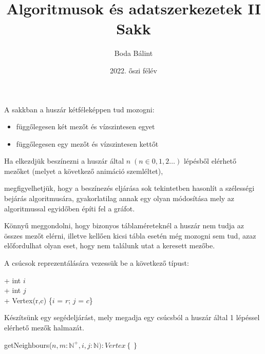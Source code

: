 \documentclass[a4paper,12pt]{article}
\title{\huge{Algoritmusok és adatszerkezetek II} \\ \large Sakk}
\author{Boda Bálint}
\date{2022. őszi félév}
\begin{document}
    \maketitle
    \noindent
    A sakkban a huszár kétféleképpen tud mozogni: \begin{itemize}
    	\item függőlegesen két mezőt és vízszintesen egyet
    	\item függőlegesen egy mezőt és vízszintesen kettőt
    \end{itemize}
	Ha elkezdjük beszínezni a huszár által $n \; \left( n \in 0,1,2\dots\right)$ lépésből elérhető mezőket (melyet a következő animáció szemléltet),  
	
	\begin{center}
	\end{center}

	\noindent
	megfigyelhetjük, hogy a beszínezés eljárása sok tekintetben hasonlít a szélességi bejárás algoritmusára, gyakorlatilag annak egy olyan módosítása mely az algoritmussal egyidőben építi fel a gráfot.

	Könnyű meggondolni, hogy bizonyos táblaméreteknél a huszár nem tudja az összes mezőt elérni, illetve kellően kicsi tábla esetén még mozogni sem tud, azaz előfordulhat olyan eset, hogy nem találunk utat a keresett mezőbe.
	
	
	\newpage
	\noindent
	A csúcsok reprezentálására vezessük be a következő típust:
	\begin{center}
		+ int $i$ \\
		+ int $j$ \\
		\hline
		+ Vertex(r,c) \{$i$ = $r$; $j$ = $c$\} \\
		\eoStruct
	\end{center}

	
	Készítsünk egy segédeljárást, mely megadja egy csúcsból a huszár által 1 lépéssel elérhető mezők halmazát.
	\begin{stuki*}[10cm]{getNeighbours($n,m:\mathbb{N}^{+},i,j:\mathbb{N}): Vertex \left\lbrace \right\rbrace $}
		\begin{WHILE}{2}{}
			\begin{IF}{1}{}
				\ELSE
			\end{IF}
		\end{WHILE}
	\end{stuki*}
\end{document}
